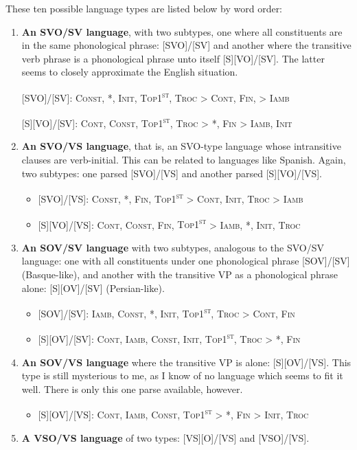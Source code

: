 \documentclass{article}
\newcommand{\cont}{\textsc{Cont}}
\newcommand{\iamb}{\textsc{Iamb}}
\newcommand{\cons}{\textsc{Const}}
\newcommand{\topf}{\textsc{Top1\textsuperscript{st}}}
\newcommand{\nophi}{\textsc{*\textphi}}
\newcommand{\finphi}{\textsc{Fin\textphi}}
\newcommand{\initphi}{\textsc{Init\textphi}}
\newcommand{\troc}{\textsc{Troc}}
\begin{document}
These ten possible language types are listed below by word order:

\begin{enumerate}
\item \textbf{An SVO/SV language}, with two subtypes, one where all constituents are in the same phonological phrase: [SVO]/[SV] and another where the transitive verb phrase is a phonological phrase unto itself [S][VO]/[SV].
	The latter seems to closely approximate the English situation.

[SVO]/[SV]: \cons, \nophi, \initphi, \topf, {\troc} {\textgreater} \cont, {\finphi,} {\textgreater} \iamb

[S][VO]/[SV]: \cont, \cons, \topf, {\troc} {\textgreater} \nophi, {\finphi} {\textgreater} \iamb, \initphi
\item \textbf{An SVO/VS language}, that is, an SVO-type language whose intransitive clauses are verb-initial.
	This can be related to languages like Spanish.
		Again, two subtypes: one parsed [SVO]/[VS] and another parsed [S][VO]/[VS].

\begin{itemize}
\item {}[SVO]/[VS]: \cons, \nophi, \finphi, {\topf} {\textgreater} \cont, \initphi, {\troc} {\textgreater} \iamb
\item {}[S][VO]/[VS]: \cont, \cons, \finphi, {\topf} {\textgreater} \iamb, \nophi, \initphi, \troc
\end{itemize}
\item \textbf{An SOV/SV language} with two subtypes, analogous to the SVO/SV language: one with all constituents under one phonological phrase [SOV]/[SV] (Basque-like), and another with the transitive VP as a phonological phrase alone: [S][OV]/[SV] (Persian-like).

\begin{itemize}
\item {}[SOV]/[SV]: \iamb, \cons, \nophi, \initphi, \topf, {\troc} {\textgreater} \cont, \finphi
\item {} [S][OV]/[SV]: \cont, \iamb, \cons, \initphi, \topf, {\troc} {\textgreater} \nophi, \finphi
\end{itemize}
\item \textbf{An SOV/VS language} where the transitive VP is alone: [S][OV]/[VS].
	This type is still mysterious to me, as I know of no language which seems to fit it well. There is only this one parse available, however.

\begin{itemize}
\item {} [S][OV]/[VS]: \cont, \iamb, \cons, {\topf} {\textgreater} \nophi, {\finphi} {\textgreater} \initphi, \troc
\end{itemize}
\item \textbf{A VSO/VS language} of two types: [VS][O]/[VS] and [VSO]/[VS].


\end{enumerate}
\end{document}

